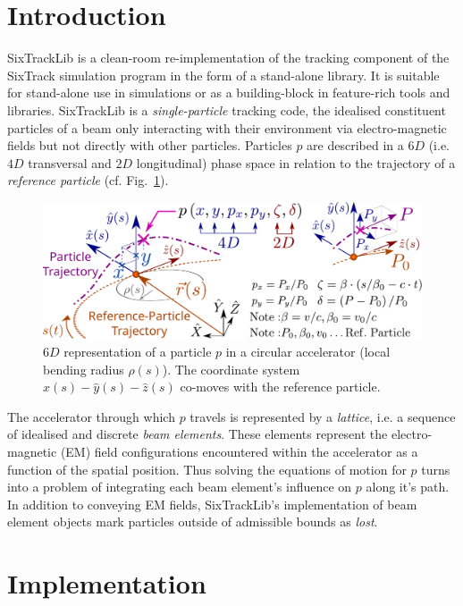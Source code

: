 \documentclass[a4paper,
               refpage,       %
               keeplastbox,   %
               ]{jacow}
\begin{document}
\section{Introduction}
SixTrackLib\cite{sixtracklib-repo-2021} is a clean-room re-implementation of the tracking component of the SixTrack\cite{demaria2019,sixtrack-repo-2021} simulation program in the form of a stand-alone library. It is suitable for stand-alone use in simulations or as a building-block in feature-rich tools and libraries. SixTrackLib is a \textit{single-particle} tracking code, the idealised constituent particles of a beam only interacting with their environment via electro-magnetic fields but not directly with other particles. Particles $p$ are described in a $6D$ (i.e. $4D$ transversal and $2D$ longitudinal) phase space in relation to the trajectory of a \textit{reference particle} (cf. Fig.~\ref{fig:coordinates}).
\begin{figure}[!htb]
   \centering
   \includegraphics*[width=.9\columnwidth]{fig_coordinates}
   \caption{$6D$ representation of a particle $p$ in a circular accelerator (local bending radius $\rho(s)$). The coordinate system $\hat{x}(s)-\hat{y}(s)-\hat{z}(s)$ co-moves with the reference particle.}
   \label{fig:coordinates}
\end{figure}
The accelerator through which $p$ travels is represented by a \textit{lattice}, i.e. a sequence of idealised and discrete \textit{beam elements}. These elements represent the electro-magnetic (EM) field configurations encountered within the accelerator as a function of the spatial position. Thus solving the equations of motion for $p$ turns into a problem of integrating each beam element's influence on $p$ along it's path. In addition to conveying EM fields, SixTrackLib's implementation of beam element objects mark particles outside of admissible bounds as \textit{lost}.

\section{Implementation}
\end{document}

